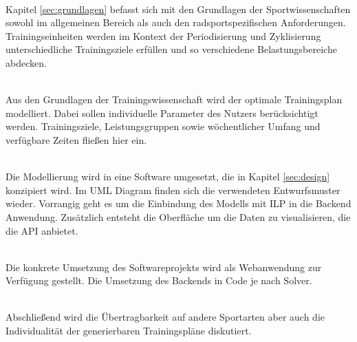 \textbf{} \\[0.2em]
Kapitel \ref{sec:grundlagen} befasst sich mit den Grundlagen der Sportwissenschaften sowohl im allgemeinen Bereich als auch den radsportspezifischen Anforderungen. Trainingseinheiten werden im Kontext der Periodisierung und Zyklisierung unterschiedliche Trainingsziele erfüllen und so verschiedene Belastungsbereiche abdecken.

\textbf{}\\[0.2em]
Aus den Grundlagen der Trainingswissenschaft wird der optimale Trainingsplan modelliert. Dabei sollen individuelle Parameter des Nutzers berücksichtigt werden. Trainingsziele, Leistungsgruppen sowie wöchentlicher Umfang und verfügbare Zeiten fließen hier ein. 

\textbf{} \\[0.2em]
Die Modellierung wird in eine Software umgesetzt, die in Kapitel \ref{sec:design} konzipiert wird. Im UML Diagram finden sich die verwendeten Entwurfsmuster wieder. Vorrangig geht es um die Einbindung des Modells mit ILP in die Backend Anwendung. Zusätzlich entsteht die Oberfläche um die Daten zu visualisieren, die die API anbietet.

\textbf{} \\[0.2em]
Die konkrete Umsetzung des Softwareprojekts wird als Webanwendung zur Verfügung gestellt. Die Umsetzung des Backends in Code je nach Solver.

\textbf{} \\[0.2em]
Abschließend wird die Übertragbarkeit auf andere Sportarten aber auch die Individualität der generierbaren Trainingspläne diskutiert.

